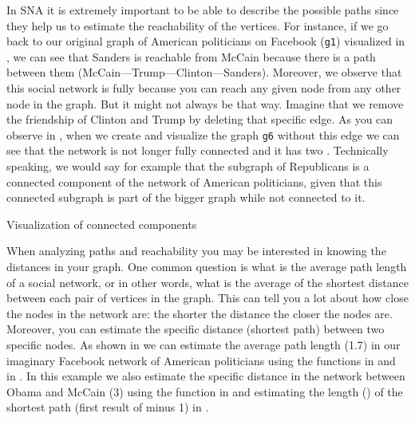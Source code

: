 In SNA it is extremely important to be able to describe the possible paths since they help us to estimate the reachability of the vertices. For instance, if we go back to our original graph of American politicians on Facebook (\texttt{g1}) visualized in , we can see that Sanders is reachable from McCain because there is a path between them (McCain---Trump---Clinton---Sanders).  Moreover, we observe that this social network is fully  because you can reach any given node from any other node in the graph. But it might not always be that way. Imagine that we remove the friendship of Clinton and Trump by deleting that specific edge. As you can observe in , when we create and visualize the graph \texttt{g6} without this edge we can see that the network is not longer fully connected and it has two . Technically speaking, we would say for example that the subgraph of Republicans is a connected component of the network of American politicians, given that this connected subgraph is part of the bigger graph while not connected to it.

\begin{ccsexample}
  \caption{Visualization of connected components}
  \label{ex:component}
\end{ccsexample}

When analyzing paths and reachability you may be interested in knowing the distances in your graph. One common question is what is the average path length of a social network, or in other words, what is the average of the shortest distance between each pair of vertices in the graph. This  can tell you a lot about how close the nodes in the network are: the shorter the distance the closer the nodes are. Moreover, you can estimate the specific distance (shortest path) between two specific nodes.  As shown in  we can estimate the average path length (1.7) in our imaginary Facebook network of American politicians using the functions  in  and  in . In this example we also estimate the specific distance in the network between Obama and McCain (3) using the function  in  and estimating the length () of the shortest path (first result of  minus 1) in .



